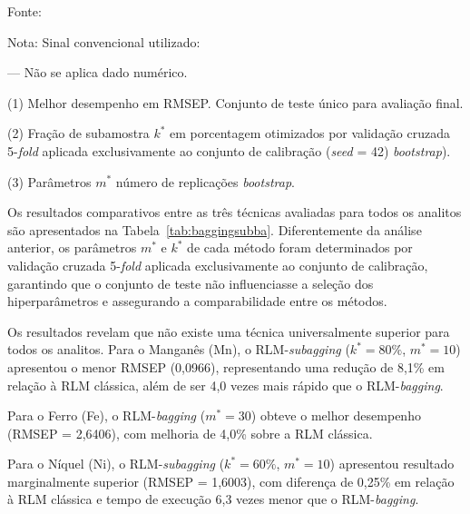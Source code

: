 \begin{table}[htbp]
\begin{tablenotes}[flushleft]
    \footnotesize
    \item \footnotesize{Fonte:~\oautor}
	\item Nota: Sinal convencional utilizado:
	\item --- Não se aplica dado numérico.
	\item (1) Melhor desempenho em RMSEP. Conjunto de teste único para avaliação final.
	\item (2) Fração de subamostra $k^*$ em porcentagem otimizados por validação cruzada 5-\textit{fold} aplicada exclusivamente ao conjunto de calibração (\textit{seed} = 42) \textit{bootstrap}).
	\item (3) Parâmetros $m^*$ número de replicações \textit{bootstrap}.
\end{tablenotes}
\end{table}







Os resultados comparativos entre as três técnicas avaliadas para 
todos os analitos são apresentados na Tabela~\ref{tab:baggingsubba}. 
Diferentemente da análise anterior, os parâmetros $m^*$ e $k^*$ de 
cada método foram determinados por validação cruzada 5-\textit{fold} 
aplicada exclusivamente ao conjunto de calibração, garantindo que o 
conjunto de teste não influenciasse a seleção dos hiperparâmetros e 
assegurando a comparabilidade entre os métodos.

Os resultados revelam que não existe uma técnica universalmente 
superior para todos os analitos. Para o Manganês (Mn), o 
RLM-\textit{subagging} ($k^* = 80\%$, $m^* = 10$) apresentou o 
menor RMSEP (0,0966), representando uma redução de 8,1\% em relação 
à RLM clássica, além de ser 4,0 vezes mais rápido que o 
RLM-\textit{bagging}.

Para o Ferro (Fe), o RLM-\textit{bagging} 
($m^* = 30$) obteve o melhor desempenho (RMSEP = 2,6406), com melhoria 
de 4,0\% sobre a RLM clássica.

Para o Níquel (Ni), o 
RLM-\textit{subagging} ($k^* = 60\%$, $m^* = 10$) apresentou 
resultado marginalmente superior (RMSEP = 1,6003), com diferença de 
0,25\% em relação à RLM clássica e tempo de execução 6,3 vezes menor 
que o RLM-\textit{bagging}.

